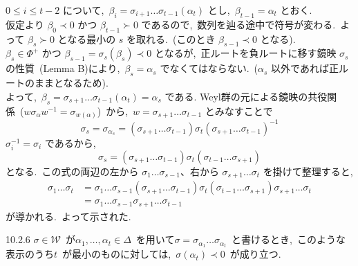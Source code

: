 \documentclass[uplatex,dvipdfmx]{jsarticle}
\begin{document}
\begin{myproof}
    $0 \le i \le t-2$ について,~$\beta_i = \sigma_{i+1} \dots \sigma_{t-1}(\alpha_t)$ とし,~$\beta_{t-1} = \alpha_t$ とおく.\\
    仮定より $\beta_0 \prec 0$ かつ $\beta_{t-1} \succ 0$ であるので,~数列を辿る途中で符号が変わる.~よって $\beta_s \succ 0$ となる最小の $s$ を取れる.~(このとき $\beta_{s-1} \prec 0$ となる).\\
    $\beta_s \in \Phi^+$ かつ $\beta_{s-1} = \sigma_s(\beta_s) \prec 0$ となるが,~正ルートを負ルートに移す鏡映 $\sigma_s$ の性質~(Lemma B)により,~$\beta_s = \alpha_s$ でなくてはならない.~($\alpha_s$ 以外であれば正ルートのままとなるため).\\
    よって,~$\beta_s = \sigma_{s+1} \dots \sigma_{t-1}(\alpha_t) = \alpha_s$ である.
    Weyl群の元による鏡映の共役関係~($w \sigma_\alpha w^{-1} = \sigma_{w(\alpha)}$)~から,~$w = \sigma_{s+1} \dots \sigma_{t-1}$ とみなすことで
    \begin{equation*}
        \sigma_s = \sigma_{\alpha_s} = (\sigma_{s+1} \dots \sigma_{t-1}) \sigma_t (\sigma_{s+1} \dots \sigma_{t-1})^{-1}
    \end{equation*}
    $\sigma_i^{-1} = \sigma_i$ であるから,~
    \begin{equation*}
        \sigma_s = (\sigma_{s+1} \dots \sigma_{t-1}) \sigma_t (\sigma_{t-1} \dots \sigma_{s+1})
    \end{equation*}
    となる.~この式の両辺の左から $\sigma_1 \dots \sigma_{s-1}$、右から $\sigma_{s+1} \dots \sigma_t$ を掛けて整理すると,
    \begin{equation*}
        \begin{split}
            \sigma_1 \dots \sigma_t &= \sigma_1 \dots \sigma_{s-1} (\sigma_{s+1} \dots \sigma_{t-1}) \sigma_t (\sigma_{t-1} \dots \sigma_{s+1}) \sigma_{s+1} \dots \sigma_t \\
                &= \sigma_1 \dots \sigma_{s-1} \sigma_{s+1} \dots \sigma_{t-1}
        \end{split}
    \end{equation*}
    が導かれる.~よって示された.
\end{myproof}
\begin{mycor}{10.2.6}
    $\sigma \in \mathcal{W}$~が$\alpha_1, \dots, \alpha_t \in \Delta$~を用いて$\sigma = \sigma_{\alpha_1} \dots \sigma_{\alpha_t}$~と書けるとき,~このような表示のうち$t$~が最小のものに対しては,~$\sigma(\alpha_t) \prec 0$~が成り立つ.
\end{mycor}
\end{document}
